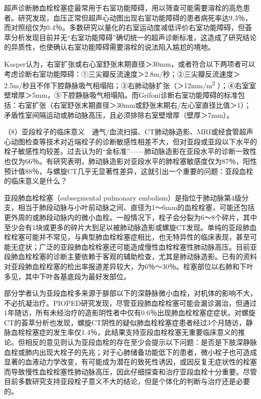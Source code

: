 超声诊断肺血栓栓塞症最常用于右室功能障碍，用以筛查可能需要溶栓的高危患者。研究发现，血压正常但超声心动图出现右室功能障碍的患者病死率达9.3％，而对照组仅为0.4％。多数研究以量化的右室运动度减低评价右室功能障碍，但荟萃分析发现目前并无“右室功能障碍”确切统一的超声诊断标准，这造成了研究结论的异质性，也使确认右室功能障碍需要溶栓的说法陷入尴尬的境地。

Kasper认为，右室扩张或右心室舒张末期直径＞30mm，或者符合以下两项者可以考虑诊断右室功能障碍：①三尖瓣反流速度＞2.8m/秒；②三尖瓣反流速度＞2.5m/秒且不伴下腔静脉吸气相塌陷；③右肺动脉扩张（＞12mm/m\textsuperscript{2}
）；④右室室壁增厚＞5mm，⑤下腔静脉吸气相塌陷。而Grifoni诊断右室功能障碍的标准包括：右室扩张（右室舒张末期直径＞30mm或舒张末期右/左心室直径比值＞1）；矛盾性室间隔运动或肺动脉高压，且必须排除右室壁增厚（壁厚＞7mm）。

（8）亚段栓子的临床意义　通气/血流扫描、CT肺动脉造影、MRI或经食管超声心动图检查等技术对近端栓子的诊断敏感性相差不大，但对亚段或亚段以下水平的栓子敏感性均较差。过去认为的“金标准”------肺动脉造影在亚段水平的诊断一致性也仅为66％。有研究表明，肺动脉造影对亚段水平的肺栓塞敏感度仅为87％，阳性预计值88％，与螺旋CT几乎无显著性差异，这就引出一个重要的问题：亚段血栓的临床意义是什么？

亚段肺血栓栓塞（subsegmental pulmonary
embolism）是指位于肺动脉第4级分支，相当于肺段动脉与小叶前动脉之间、直径为1～6mm的血栓栓塞，可能还包括更外周的或肺段动脉内的微小血栓。一般情况下，栓子会分裂为6～8个碎片，其中至少会有1块或更多的碎片大到足以被肺动脉造影或螺旋CT发现。单纯的亚段肺血栓栓塞可能并不常见，与典型肺血栓栓塞症相比，也无特异性的临床表现，甚至可能无症状；广泛的亚段肺血栓栓塞还可能造成慢性血栓栓塞性肺动脉高压。目前亚段肺血栓栓塞的诊断主要依赖于客观的辅助检查，尤其是肺动脉造影。已有的资料对亚段肺血栓栓塞的检出率报道差异较大，为6％～30％。栓塞部位以右肺和下叶多见，其中下叶各基底段为最好发部位。

部分学者认为亚段血栓多来源于腓部以下的深静脉微小血栓，对机体的影响不大，不必抗凝治疗。PIOPED研究发现，尽管亚段肺血栓栓塞可能会漏诊漏治，但通过1年随访，所有未经治疗的造影阴性者中仅有0.6％出现肺血栓栓塞症症状。对螺旋CT的荟萃分析也发现，螺旋CT阴性的疑似肺血栓栓塞症患者经过3个月随访，静脉血栓栓塞症的发生率仅1.4％，此结果支持亚段血栓栓塞无重要临床意义的推论。但相反的意见则认为亚段血栓的存在至少会提示以下问题：是否是下肢深静脉血栓或肺内出现大栓子的先兆；对于心肺储备功能低下的患者，微小栓子也可造成显著的血液动力学改变，有可能成为潜在的致死性诱因，或因反复无症状性的栓塞而导致慢性血栓栓塞性肺动脉高压，因此仔细探查和治疗亚段血栓十分重要。尽管目前多数研究支持亚段栓子意义不大的结论，但是个体化的判断与治疗还是必要的。

